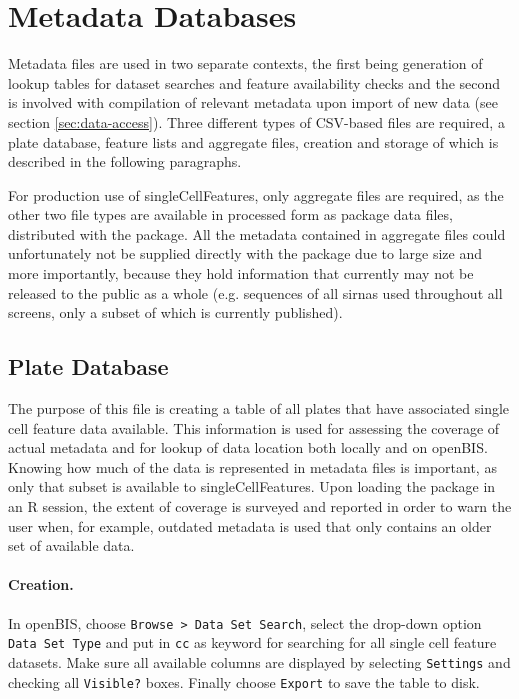 
\section{Metadata Databases}
\label{sec:update-metadata}
Metadata files are used in two separate contexts, the first being generation of lookup tables for dataset searches and feature availability checks and the second is involved with compilation of relevant metadata upon import of new data (see section \ref{sec:data-access}). Three different types of CSV-based files are required, a plate database, feature lists and aggregate files, creation and storage of which is described in the following paragraphs.

For production use of singleCellFeatures, only aggregate files are required, as the other two file types are available in processed form as package data files, distributed with the package. All the metadata contained in aggregate files could unfortunately not be supplied directly with the package due to large size and more importantly, because they hold information that currently may not be released to the public as a whole (e.g. sequences of all \glspl{sirna} used throughout all screens, only a subset of which is currently published).

\subsection{Plate Database}
\label{sec:plate-database}
The purpose of this file is creating a table of all plates that have associated single cell feature data available. This information is used for assessing the coverage of actual metadata and for lookup of data location both locally and on openBIS. Knowing how much of the data is represented in metadata files is important, as only that subset is available to singleCellFeatures. Upon loading the package in an R session, the extent of coverage is surveyed and reported in order to warn the user when, for example, outdated metadata is used that only contains an older set of available data.

\paragraph{Creation.}
In openBIS, choose \texttt{Browse > Data Set Search}, select the drop-down option \texttt{Data Set Type} and put in \texttt{cc} as keyword for searching for all single cell feature datasets. Make sure all available columns are displayed by selecting \texttt{Settings} and checking all \texttt{Visible?} boxes. Finally choose \texttt{Export} to save the table to disk.

